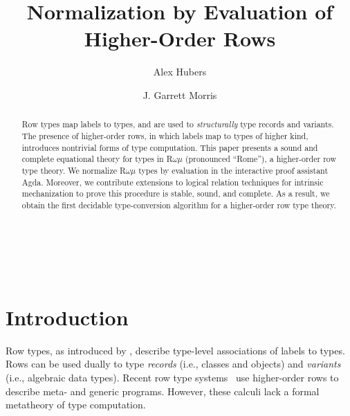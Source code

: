 \documentclass[sigplan,screen]{acmart}
\title{Normalization by Evaluation of Higher-Order Rows}
\author{Alex Hubers}
\affiliation{%
  \institution{University of Iowa}
  \city{Iowa City}
  \country{USA}
}
\author{J. Garrett Morris}
\affiliation{%
  \institution{University of Iowa}
  \city{Iowa City}
  \country{USA}
}
\newif\ifintro\introtrue
\begin{document}
\begin{code}[hide]%
\>[0]\AgdaSymbol{\{-\#}\AgdaSpace{}%
\AgdaSpace{}%
\AgdaSpace{}%
\AgdaSpace{}%
\AgdaSymbol{\#-\}}\<%
\\
\>[0]\AgdaSpace{}%
\AgdaSpace{}%
\<%
\\
\>[0]\AgdaSpace{}%
\AgdaSpace{}%
\<%
\end{code}


\begin{abstract}
Row types map labels to types, and are used to \emph{structurally} type records and variants. The presence of higher-order rows, in which labels map to types of higher kind, introduces nontrivial forms of type computation. This paper presents a sound and complete equational theory for types in \textrm{R$\omega\mu$} (pronounced ``Rome''), a higher-order row type theory. We normalize \textrm{R$\omega\mu$} types by evaluation in the interactive proof assistant Agda. Moreover, we contribute extensions to logical relation techniques for intrinsic mechanization to prove this procedure is stable, sound, and complete. As a result, we obtain the first decidable type-conversion algorithm for a higher-order row type theory.
\end{abstract}


\maketitle


\section{Introduction}
\label{sec:intro}
\ifintro

Row types, as introduced by \citet{wand87}, describe type-level associations of labels to types. Rows can be used dually to type \emph{records} (i.e., classes and objects) and \emph{variants} (i.e., algebraic data types). Recent row type systems~\citep{HubersM23,Chlipala10,Chlipala16, TooheyCJX26} use higher-order rows to describe meta- and generic programs. However, these calculi lack a formal metatheory of type computation.
\end{document}
